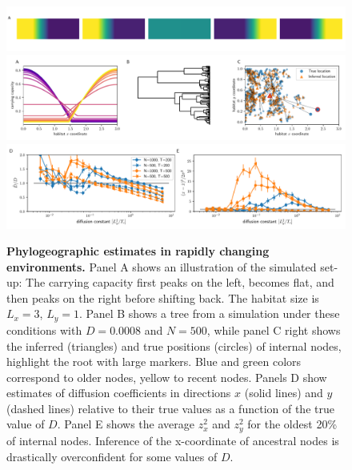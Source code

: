 \documentclass[aps,rmp, twocolumn]{revtex4}
\begin{document}
\begin{figure}
    \includegraphics[width=\textwidth]{figures/seasaw_illustration}
    \includegraphics[width=\textwidth]{figures/seasaw_example}
    \includegraphics[width=\textwidth]{figures/seasaw}
    \caption{\label{fig:seasaw} {\bf Phylogeographic estimates in rapidly changing environments.} Panel A shows an illustration of the simulated set-up: The carrying capacity first peaks on the left, becomes flat, and then peaks on the right before shifting back. The habitat size is $L_x=3$, $L_y=1$.
    Panel B shows a tree from a simulation under these conditions with $D=0.0008$ and $N=500$, while panel C right shows the inferred (triangles) and true positions (circles) of internal nodes, highlight the root with large markers. Blue and green colors correspond to older nodes, yellow to recent nodes.
    Panels D show estimates of diffusion coefficients in directions $x$ (solid lines) and $y$ (dashed lines) relative to their true values as a function of the true value of $D$. Panel E shows the average $z_x^2$ and $z_y^2$ for the oldest 20\% of internal nodes. Inference of the x-coordinate of ancestral nodes is drastically overconfident for some values of $D$. }
\end{figure}
\end{document}
